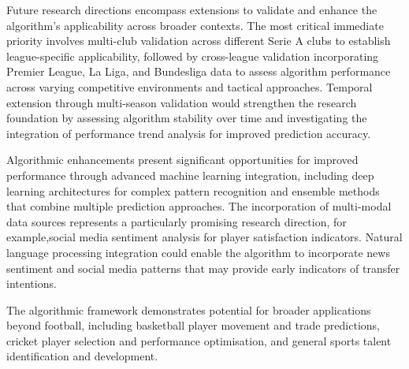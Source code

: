 Future research directions encompass extensions to validate and enhance the algorithm's applicability across broader contexts. The most critical immediate priority involves multi-club validation across different Serie A clubs to establish league-specific applicability, followed by cross-league validation incorporating Premier League, La Liga, and Bundesliga data to assess algorithm performance across varying competitive environments and tactical approaches. Temporal extension through multi-season validation would strengthen the research foundation by assessing algorithm stability over time and investigating the integration of performance trend analysis for improved prediction accuracy.

Algorithmic enhancements present significant opportunities for improved performance through advanced machine learning integration, including deep learning architectures for complex pattern recognition and ensemble methods that combine multiple prediction approaches. The incorporation of multi-modal data sources represents a particularly promising research direction, for example,social media sentiment analysis for player satisfaction indicators. Natural language processing integration could enable the algorithm to incorporate news sentiment and social media patterns that may provide early indicators of transfer intentions.

The algorithmic framework demonstrates potential for broader applications beyond football, including basketball player movement and trade predictions, cricket player selection and performance optimisation, and general sports talent identification and development.